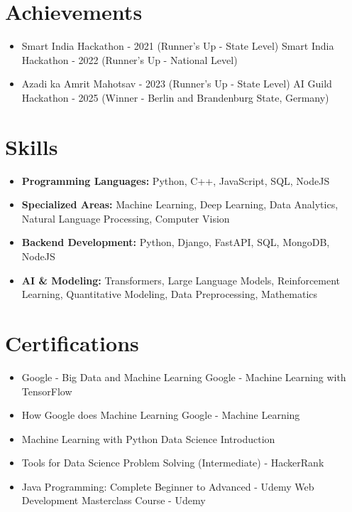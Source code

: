 \documentclass[a4paper,10pt]{article}
\begin{document}
\section*{Achievements}
\begin{itemize}
\item Smart India Hackathon - 2021 (Runner's Up - State Level) \hfill Smart India Hackathon - 2022 (Runner's Up - National Level)
\item Azadi ka Amrit Mahotsav - 2023 (Runner's Up - State Level) \hfill AI Guild Hackathon - 2025 (Winner - Berlin and Brandenburg State, Germany)
\end{itemize}

\section*{Skills}
\begin{itemize}
  \item \textbf{Programming Languages:} Python, C++, JavaScript, SQL, NodeJS
  \item \textbf{Specialized Areas:} Machine Learning, Deep Learning, Data Analytics, Natural Language Processing, Computer Vision
  \item \textbf{Backend Development:} Python, Django, FastAPI, SQL, MongoDB, NodeJS
  \item \textbf{AI \& Modeling:} Transformers, Large Language Models, Reinforcement Learning, Quantitative Modeling, Data Preprocessing, Mathematics
\end{itemize}

\section*{Certifications}
\begin{itemize}
\item Google - Big Data and Machine Learning \hfill Google - Machine Learning with TensorFlow
\item How Google does Machine Learning \hfill Google - Machine Learning
\item Machine Learning with Python \hfill Data Science Introduction
\item Tools for Data Science \hfill Problem Solving (Intermediate) - HackerRank
\item Java Programming: Complete Beginner to Advanced - Udemy \hfill Web Development Masterclass Course - Udemy
\end{itemize}
\end{document}
